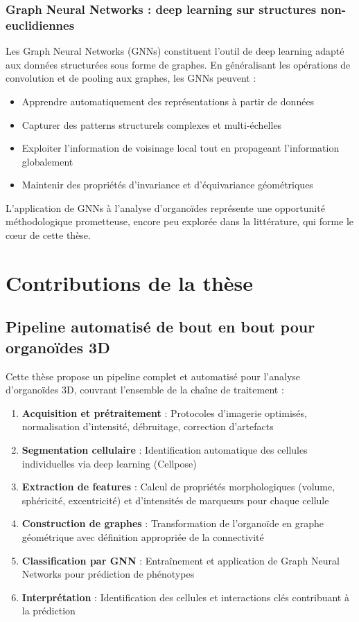 \subsubsection{Graph Neural Networks : deep learning sur structures non-euclidiennes}

Les Graph Neural Networks (GNNs) constituent l'outil de deep learning adapté aux données structurées sous forme de graphes. En généralisant les opérations de convolution et de pooling aux graphes, les GNNs peuvent :
\begin{itemize}
    \item Apprendre automatiquement des représentations à partir de données
    \item Capturer des patterns structurels complexes et multi-échelles
    \item Exploiter l'information de voisinage local tout en propageant l'information globalement
    \item Maintenir des propriétés d'invariance et d'équivariance géométriques
\end{itemize}

L'application de GNNs à l'analyse d'organoïdes représente une opportunité méthodologique prometteuse, encore peu explorée dans la littérature, qui forme le cœur de cette thèse.

\section{Contributions de la thèse}

\subsection{Pipeline automatisé de bout en bout pour organoïdes 3D}

Cette thèse propose un pipeline complet et automatisé pour l'analyse d'organoïdes 3D, couvrant l'ensemble de la chaîne de traitement :

\begin{enumerate}
    \item \textbf{Acquisition et prétraitement} : Protocoles d'imagerie optimisés, normalisation d'intensité, débruitage, correction d'artefacts
    \item \textbf{Segmentation cellulaire} : Identification automatique des cellules individuelles via deep learning (Cellpose)
    \item \textbf{Extraction de features} : Calcul de propriétés morphologiques (volume, sphéricité, excentricité) et d'intensités de marqueurs pour chaque cellule
    \item \textbf{Construction de graphes} : Transformation de l'organoïde en graphe géométrique avec définition appropriée de la connectivité
    \item \textbf{Classification par GNN} : Entraînement et application de Graph Neural Networks pour prédiction de phénotypes
    \item \textbf{Interprétation} : Identification des cellules et interactions clés contribuant à la prédiction
\end{enumerate}

